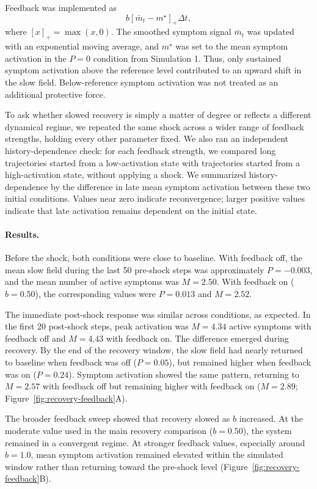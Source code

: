 \documentclass[man,12pt,floatsintext]{apa7}
\begin{document}
Feedback was implemented as
\[
b[\bar m_t-m^\star]_+\Delta t,
\]
where \([x]_+=\max(x,0)\). The smoothed symptom signal \(\bar m_t\) was updated
with an exponential moving average, and \(m^\star\) was set to the mean symptom
activation in the \(P=0\) condition from Simulation 1. Thus, only sustained
symptom activation above the reference level contributed to an upward shift in
the slow field. Below-reference symptom activation was not treated as an
additional protective force.

To ask whether slowed recovery is simply a matter of degree or reflects a
different dynamical regime, we repeated the same shock across a wider range of
feedback strengths, holding every other parameter fixed. We also ran an
independent history-dependence check: for each feedback strength, we compared
long trajectories started from a low-activation state with trajectories started
from a high-activation state, without applying a shock. We summarized
history-dependence by the difference in late mean symptom activation between
these two initial conditions. Values near zero indicate reconvergence; larger
positive values indicate that late activation remains dependent on the initial
state.

\paragraph{Results.}
Before the shock, both conditions were close to baseline. With feedback off,
the mean slow field during the last 50 pre-shock steps was approximately
\(P=-0.003\), and the mean number of active symptoms was \(M=2.50\). With
feedback on (\(b=0.50\)), the corresponding values were \(P=0.013\) and
\(M=2.52\).

The immediate post-shock response was similar across conditions, as expected.
In the first 20 post-shock steps, peak activation was \(M=4.34\) active
symptoms with feedback off and \(M=4.43\) with feedback on. The difference
emerged during recovery. By the end of the recovery window, the slow field had
nearly returned to baseline when feedback was off (\(P=0.05\)), but remained
higher when feedback was on (\(P=0.24\)). Symptom activation showed the same
pattern, returning to \(M=2.57\) with feedback off but remaining higher with
feedback on (\(M=2.89\); Figure~\ref{fig:recovery-feedback}A).

The broader feedback sweep showed that recovery slowed as \(b\) increased. At
the moderate value used in the main recovery comparison (\(b=0.50\)), the
system remained in a convergent regime. At stronger feedback values, especially around \(b=1.0\), mean symptom
activation remained elevated within the simulated window rather than returning toward the pre-shock level (Figure~\ref{fig:recovery-feedback}B).
\end{document}
